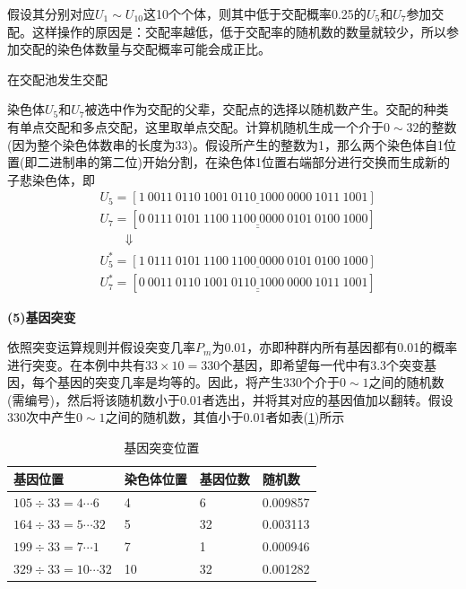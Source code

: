             假设其分别对应$U_1\sim U_{10}$这10个个体，则其中低于交配概率0.25的$U_5$和$U_7$参加交配。这样操作的原因是：交配率越低，低于交配率的随机数的数量就较少，所以参加交配的染色体数量与交配概率可能会成正比。
            \par
            在交配池发生交配
            \par
            染色体$U_5$和$U_7$被选中作为交配的父辈，交配点的选择以随机数产生。交配的种类有单点交配和多点交配，这里取单点交配。计算机随机生成一个介于$0\sim 32$的整数(因为整个染色体数串的长度为33)。假设所产生的整数为1，那么两个染色体自1位置(即二进制串的第二位)开始分割，在染色体1位置右端部分进行交换而生成新的子悲染色体，即
            \begin{align*}
            & U_5 = [1\ \underline{0011\ 0110\ 1001\ 0110\ 1000 \ 0000\ 1011\ 1001}]\\
            & U_7 = [0\ \underline{\underline{0111\ 0101\ 1100\ 1100 \ 0000\ 0101\ 0100 \ 1000}}]\\
            & \qquad \Downarrow\\
            & U_5^* = [1\ \underline{0111\ 0101\ 1100\ 1100 \ 0000\ 0101\ 0100 \ 1000}]\\
            & U_7^* = [0\ \underline{\underline{0011\ 0110\ 1001\ 0110\ 1000 \ 0000\ 1011\ 1001}}]
            \end{align*}
            \par
            \textbf{(5)基因突变}
            \par
            依照突变运算规则并假设突变几率$P_m$为0.01，亦即种群内所有基因都有0.01的概率进行突变。在本例中共有$33\times 10=330$个基因，即希望每一代中有3.3个突变基因，每个基因的突变几率是均等的。因此，将产生330个介于$0\sim 1$之间的随机数(需编号)，然后将该随机数小于0.01者选出，并将其对应的基因值加以翻转。假设330次中产生$0\sim 1$之间的随机数，其值小于0.01者如表(\ref{基因突变位置})所示
            \begin{table}[H]
            \caption{基因突变位置}
            \label{基因突变位置}
            \begin{tabularx}{\textwidth}{|Y|Y|Y|Y|}
            \hline
            基因位置 & 染色体位置 & 基因位数 & 随机数 \\\hline
            $105\div 33=4\cdots 6$ & 4 & 6 & 0.009857\\\hline
            $164\div 33=5\cdots 32$ & 5 & 32 & 0.003113\\\hline
            $199\div 33=7\cdots 1$ & 7 & 1& 0.000946\\\hline
            $329\div 33=10\cdots 32$ & 10 & 32 & 0.001282\\\hline
            \end{tabularx}
            \end{table}
